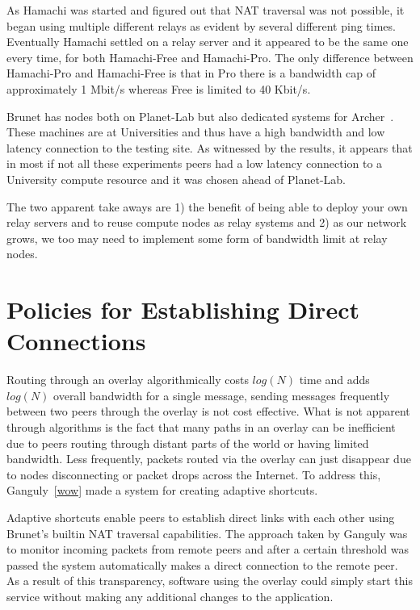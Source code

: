 As Hamachi was started and figured out that NAT traversal was not possible, it
began using multiple different relays as evident by several different ping
times.  Eventually Hamachi settled on a relay server and it appeared to be the
same one every time, for both Hamachi-Free and Hamachi-Pro.  The only
difference between Hamachi-Pro and Hamachi-Free is that in Pro there is a
bandwidth cap of approximately 1 Mbit/s whereas Free is limited to 40 Kbit/s.

Brunet has nodes both on Planet-Lab but also dedicated systems for
Archer~\cite{archer}.  These machines are at Universities and thus have a high
bandwidth and low latency connection to the testing site.  As witnessed by the
results, it appears that in most if not all these experiments peers had a low
latency connection to a University compute resource and it was chosen ahead of
Planet-Lab.

The two apparent take aways are 1) the benefit of being able to deploy your own
relay servers and to reuse compute nodes as relay systems and 2) as our network
grows, we too may need to implement some form of bandwidth limit at relay
nodes.

\section{Policies for Establishing Direct Connections}

Routing through an overlay algorithmically costs $log(N)$ time and adds
$log(N)$ overall bandwidth for a single message, sending messages frequently
between two peers through the overlay is not cost effective.  What is not
apparent through algorithms is the fact that many paths in an overlay can be
inefficient due to peers routing through distant parts of the world or having
limited bandwidth.  Less frequently, packets routed via the overlay can just
disappear due to nodes disconnecting or packet drops across the Internet.  To
address this, Ganguly~\ref{wow} made a system for creating adaptive shortcuts.

Adaptive shortcuts enable peers to establish direct links with each other using
Brunet's builtin NAT traversal capabilities.  The approach taken by Ganguly was
to monitor incoming packets from remote peers and after a certain threshold was
passed the system automatically makes a direct connection to the remote peer.
As a result of this transparency, software using the overlay could simply start
this service without making any additional changes to the application.  

